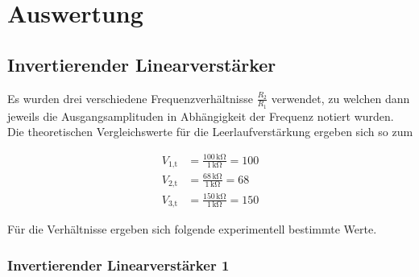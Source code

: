 \section{Auswertung}
\label{sec:Auswertung}


 
\subsection{Invertierender Linearverstärker}
\label{sec:InvertinAmpl}
 
Es wurden drei verschiedene Frequenzverhältnisse $\frac{R_2}{R_1}$ verwendet, zu welchen dann jeweils die Ausgangsamplituden in Abhängigkeit der Frequenz notiert wurden.
Die theoretischen Vergleichswerte für die Leerlaufverstärkung ergeben sich so zum

\begin{align*}
    V_{\text{1,t}} &= \frac{100\,\unit{\kilo\ohm}}{1\,\unit{\kilo\ohm}} =100\\
    V_{\text{2,t}} &= \frac{68\,\unit{\kilo\ohm}}{1\,\unit{\kilo\ohm}} =68\\
    V_{\text{3,t}} &= \frac{150\,\unit{\kilo\ohm}}{1\,\unit{\kilo\ohm}} =150
\end{align*}

Für die Verhältnisse ergeben sich folgende experimentell bestimmte Werte.

\subsubsection{Invertierender Linearverstärker 1}
\label{sec:InvertierenderLinearverstärker1}

